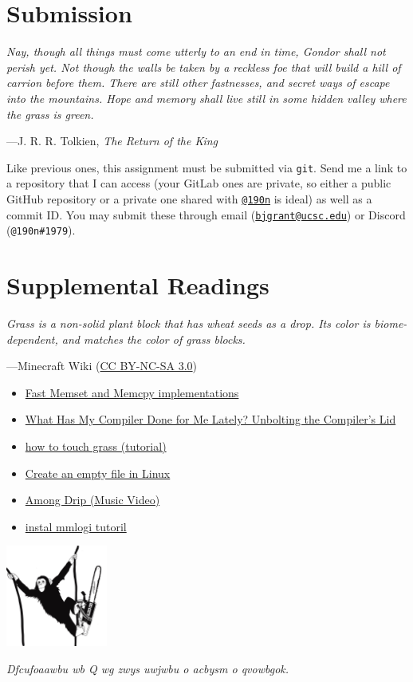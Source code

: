 \documentclass[11pt]{article}
\begin{document}
\section{Submission}

\epigraph{\emph{Nay, though all things must come utterly to an end in time, Gondor shall not perish yet. Not though the walls be taken by a reckless foe that will build a hill of carrion before them. There are still other fastnesses, and secret ways of escape into the mountains. Hope and memory shall live still in some hidden valley where the grass is green.}}{---J. R. R. Tolkien, \emph{The Return of the King}}

\noindent
Like previous ones, this assignment must be submitted via \texttt{git}. Send me a link to a repository that I can access (your GitLab ones are private, so either a public GitHub repository or a private one shared with \href{https://github.com/190n}{\texttt{@190n}} is ideal) as well as a commit ID. You may submit these through email (\href{mailto:bjgrant@ucsc.edu?subject=Assignment\%208\%20submission}{\texttt{bjgrant@ucsc.edu}}) or Discord (\texttt{@190n\#1979}).

\section{Supplemental Readings}

\epigraph{\emph{Grass is a non-solid plant block that has wheat seeds as a drop. Its color is biome-dependent, and matches the color of grass blocks.}}{---Minecraft Wiki (\href{https://creativecommons.org/licenses/by-nc-sa/3.0/}{CC BY-NC-SA 3.0})}

\begin{itemize}
    \item \href{https://github.com/nadavrot/memset_benchmark}{Fast Memset and Memcpy implementations}
    \item \href{https://www.youtube.com/watch?v=bSkpMdDe4g4}{What Has My Compiler Done for Me Lately? Unbolting the Compiler's Lid}
    \item \href{https://www.youtube.com/watch?v=Tix4hb2K3mY}{how to touch grass (tutorial)}
    \item \href{https://techwritersblog.com/linux/create_an_empty_file_in_linux/}{Create an empty file in Linux}
    \item \href{https://www.youtube.com/watch?v=xyOc32abDQ8}{Among Drip (Music Video)}
    \item \href{https://www.youtube.com/watch?v=cVF4rat_wFY}{instal mmlogi tutoril}
\end{itemize}

\begin{center}
\includegraphics[width=0.25\textwidth]{monke}

\emph{Dfcufoaawbu wb Q wg zwys uwjwbu o acbysm o qvowbgok.}
\end{center}
\end{document}
